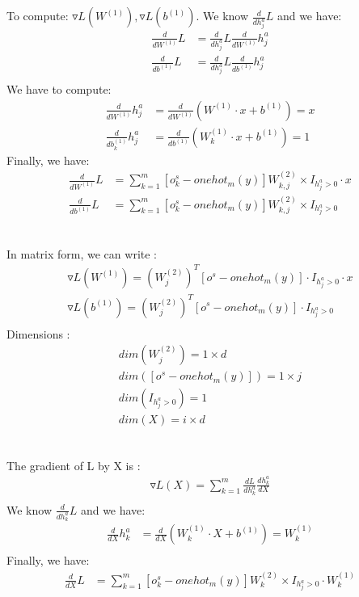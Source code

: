 \documentclass[12pt]{article}
\begin{document}
\subsection{}
To compute: $\triangledown L(W^{(1)}), \triangledown L(b^{(1)})$.
We know $\frac{d}{dh^a_j} L$ and we have:
\begin{align*}
\frac{d}{dW^{(1)}} L &= \frac{d}{dh^a_j} L \frac{d}{dW^{(1)}} h^a_j \\
\frac{d}{db^{(1)}} L &= \frac{d}{dh^a_j} L \frac{d}{db^{(1)}} h^a_j \\
\end{align*}
We have to compute:
\begin{align*}
\frac{d}{dW^{(1)}} h^a_j & = \frac{d}{dW^{(1)}} (W^{(1)} \cdot x + b^{(1)}) = x \\
\frac{d}{db^{(1)}_{k}} h^a_j &= \frac{d}{db^{(1)}} (W^{(1)}_{k} \cdot x + b^{(1)}) = 1
\end{align*}
Finally, we have:
\begin{align*}
\frac{d}{dW^{(1)}} L & =  \sum\limits_{k=1}^m [o^s_k - onehot_m(y)]  W^{(2)}_{k,j} \times I_{h^a_j > 0} \cdot x \\
\frac{d}{db^{(1)}} L & =   \sum\limits_{k=1}^m [o^s_k - onehot_m(y)]  W^{(2)}_{k,j} \times I_{h^a_j > 0} \\
\end{align*}
\subsection{}
In matrix form, we can write :
\begin{align*}
\triangledown L(W^{(1)}) =(W^{(2)}_j)^T [o^s - onehot_m(y)] \cdot I_{h^a_j > 0} \cdot x \\
\triangledown L(b^{(1)}) =(W^{(2)}_j)^T [o^s - onehot_m(y)] \cdot I_{h^a_j > 0} \\
\end{align*}
Dimensions :
\begin{align*}
dim(W^{(2)}_j ) = 1 \times d \\
dim([o^s - onehot_m(y)]) = 1 \times j \\
dim(I_{h^a_j > 0}) = 1 \\
dim(X) = i \times d \\
\end{align*}
\subsection{}
The gradient of L by X is :
\begin{align*}
\triangledown L(X) = \sum\limits_{k=1}^m \frac{dL}{dh^a_k} \frac{d{h^a_k}}{dX} \\
\end{align*}
We know $\frac{d}{dh^a_k} L$ and we have:
\begin{align*}
\frac{d}{dX} h^a_k & = \frac{d}{dX} (W^{(1)}_k \cdot X + b^{(1)}) = W^{(1)}_k \\
\end{align*}
Finally, we have:
\begin{align*}
\frac{d}{dX} L &  = \sum\limits_{k=1}^m [o^s_k - onehot_m(y)]  W^{(2)}_{k} \times I_{h^a_j > 0} \cdot W^{(1)}_{k} \\
\end{align*}
\end{document}
